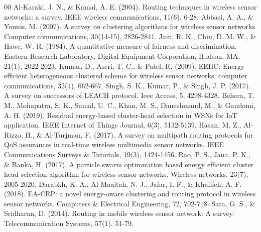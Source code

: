 \documentclass[conference]{IEEEtran}
\begin{document}
\begin{thebibliography}{00}
 Al-Karaki, J. N., \& Kamal, A. E. (2004). Routing techniques in wireless sensor networks: a survey. IEEE wireless communications, 11(6), 6-28.
 Abbasi, A. A., \& Younis, M. (2007). A survey on clustering algorithms for wireless sensor networks. Computer communications, 30(14-15), 2826-2841.
 Jain, R. K., Chiu, D. M. W., \& Hawe, W. R. (1984). A quantitative measure of fairness and discrimination. Eastern Research Laboratory, Digital Equipment Corporation, Hudson, MA, 21(1), 2022-2023.
 Kumar, D., Aseri, T. C., \& Patel, R. (2009). EEHC: Energy efficient heterogeneous clustered scheme for wireless sensor networks. computer communications, 32(4), 662-667.
 Singh, S. K., Kumar, P., \& Singh, J. P. (2017). A survey on successors of LEACH protocol. Ieee Access, 5, 4298-4328.
 Behera, T. M., Mohapatra, S. K., Samal, U. C., Khan, M. S., Daneshmand, M., \& Gandomi, A. H. (2019). Residual energy-based cluster-head selection in WSNs for IoT application. IEEE Internet of Things Journal, 6(3), 5132-5139.
 Hasan, M. Z., Al-Rizzo, H., \& Al-Turjman, F. (2017). A survey on multipath routing protocols for QoS assurances in real-time wireless multimedia sensor networks. IEEE Communications Surveys \& Tutorials, 19(3), 1424-1456.
 Rao, P. S., Jana, P. K., \& Banka, H. (2017). A particle swarm optimization based energy efficient cluster head selection algorithm for wireless sensor networks. Wireless networks, 23(7), 2005-2020.
 Darabkh, K. A., Al-Maaitah, N. J., Jafar, I. F., \& Khalifeh, A. F. (2018). EA-CRP: a novel energy-aware clustering and routing protocol in wireless sensor networks. Computers \& Electrical Engineering, 72, 702-718.
 Sara, G. S., \& Sridharan, D. (2014). Routing in mobile wireless sensor network: A survey. Telecommunication Systems, 57(1), 51-79.
\end{thebibliography}

\vspace{12pt}
\end{document}
